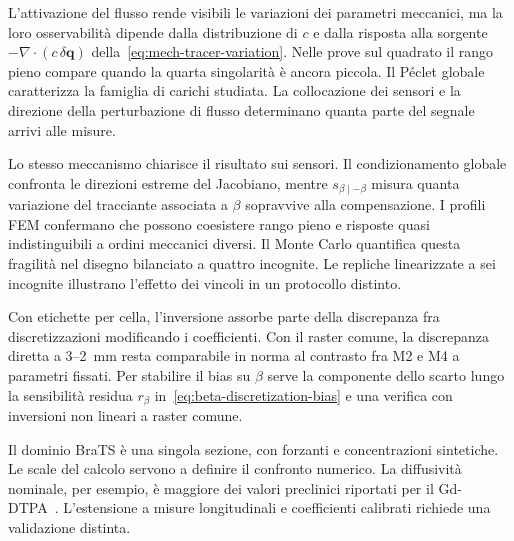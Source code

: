 L'attivazione del flusso rende visibili le variazioni dei parametri meccanici, ma la loro osservabilità dipende dalla distribuzione di $c$ e dalla risposta alla sorgente $-\nabla\cdot(c\,\delta\mathbf q)$ della~\eqref{eq:mech-tracer-variation}. Nelle prove sul quadrato il rango pieno compare quando la quarta singolarità è ancora piccola. Il Péclet globale caratterizza la famiglia di carichi studiata. La collocazione dei sensori e la direzione della perturbazione di flusso determinano quanta parte del segnale arrivi alle misure.

Lo stesso meccanismo chiarisce il risultato sui sensori. Il condizionamento globale confronta le direzioni estreme del Jacobiano, mentre $s_{\beta\mid-\beta}$ misura quanta variazione del tracciante associata a $\beta$ sopravvive alla compensazione. I profili FEM confermano che possono coesistere rango pieno e risposte quasi indistinguibili a ordini meccanici diversi. Il Monte Carlo quantifica questa fragilità nel disegno bilanciato a quattro incognite. Le repliche linearizzate a sei incognite illustrano l'effetto dei vincoli in un protocollo distinto.

Con etichette per cella, l'inversione assorbe parte della discrepanza fra discretizzazioni modificando i coefficienti. Con il raster comune, la discrepanza diretta a 3--2~mm resta comparabile in norma al contrasto fra M2 e M4 a parametri fissati. Per stabilire il bias su $\beta$ serve la componente dello scarto lungo la sensibilità residua $r_\beta$ in~\eqref{eq:beta-discretization-bias} e una verifica con inversioni non lineari a raster comune.

Il dominio BraTS è una singola sezione, con forzanti e concentrazioni sintetiche. Le scale del calcolo servono a definire il confronto numerico. La diffusività nominale, per esempio, è maggiore dei valori preclinici riportati per il Gd-DTPA~\citep{he2013gdtracer,wang2019gdtracer}. L'estensione a misure longitudinali e coefficienti calibrati richiede una validazione distinta.
